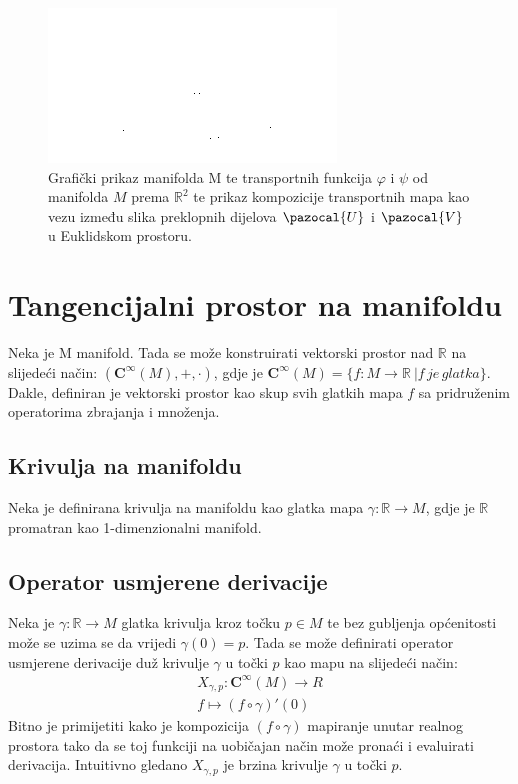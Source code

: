 \documentclass[times, utf8, diplomski]{fer}
\newcommand{\Va}{\pazocal{V}}
\newcommand{\Ua}{\pazocal{U}}
\begin{document}
	\begin{figure}[h]
		\includegraphics[width=\textwidth]{figures/fig_overlap_charts.png}
		\caption{Grafički prikaz manifolda M te transportnih funkcija $\varphi$ i $\psi$ od manifolda $M$ prema $\mathbb{R}^2$ te prikaz kompozicije transportnih mapa kao vezu između slika preklopnih dijelova $\Ua$ i $\Va$ u Euklidskom prostoru.}
	\end{figure}

\section{Tangencijalni prostor na manifoldu}

	Neka je M manifold. Tada se može konstruirati vektorski prostor nad $\mathbb{R}$ na slijedeći način: $(\boldsymbol{C}^\infty(M), +, \cdot)$, gdje je $\boldsymbol{C}^\infty(M) = \{ f: M \rightarrow \mathbb{R} \ | f \,je\, glatka\}$. Dakle, definiran je vektorski prostor kao skup svih glatkih mapa $f$ sa pridruženim operatorima zbrajanja i množenja. 
	
	\subsection{Krivulja na manifoldu} Neka je definirana krivulja na manifoldu kao glatka mapa $\gamma:\mathbb{R} \rightarrow M$, gdje je $\mathbb{R}$ promatran kao 1-dimenzionalni manifold.
	
	\subsection{Operator usmjerene derivacije} Neka je $\gamma: \mathbb{R} \rightarrow M$ glatka krivulja kroz točku $p\in M$ te bez gubljenja općenitosti može se uzima se da vrijedi $\gamma(0) = p$. Tada se može definirati operator usmjerene derivacije duž krivulje $\gamma$ u točki $p$ kao mapu na slijedeći način: \\
	\begin{gather}
		X_{\gamma, p} : \boldsymbol{C}^\infty(M) \rightarrow R \\
		f \mapsto (f \circ \gamma)'(0)
	\end{gather}
	Bitno je primijetiti kako je kompozicija $(f \circ \gamma)$ mapiranje unutar realnog prostora tako da se toj funkciji na uobičajan način može pronaći i evaluirati derivacija.
	Intuitivno gledano $X_{\gamma, p}$ je brzina krivulje $\gamma$ u točki $p$.
	
\end{document}
